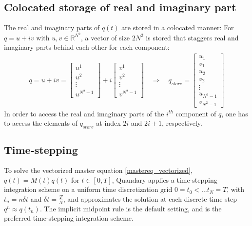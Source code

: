 \documentclass[11pt]{article}
\newcommand{\R}{\mathds{R}}
\begin{document}
  \subsection{Colocated storage of real and imaginary part}
  The real and imaginary parts of $q(t)$ are stored in a colocated manner: For
  $q = u+iv$ with $u,v\in\R^{N^2}$, a vector of size $2N^2$ is stored that
  staggers real and imaginary parts behind each other for each component:
  \begin{align*}
    q = u+iv = \begin{bmatrix}
     u^1\\u^2\\ \vdots \\ u^{N^2-1} 
    \end{bmatrix}
    + i \begin{bmatrix}
     v^1\\v^2\\ \vdots \\ v^{N^2-1} 
    \end{bmatrix}
    \quad \Rightarrow \quad
    q_{store} = \begin{bmatrix}
      u_1 \\ v_1\\ u_2 \\ v_2 \\ \vdots \\ u_{N^2-1} \\ v_{N^2-1}
    \end{bmatrix}
  \end{align*}
  In order to access the real and imaginary parts of the $i^{th}$ component of
  $q$, one has to access the elements of $q_{store}$ at index $2i$ and $2i+1$,
  respectively. 

  \subsection{Time-stepping}
    To solve the vectorized master equation \eqref{mastereq_vectorized}, $\dot
    q(t) = M(t) q(t)$ for $t\in [0,T]$, Quandary applies a time-stepping integration
    scheme on a uniform time discretization grid $0=t_0 < \dots t_{N} = T$, with
    $t_n = n \delta t$ and $\delta t = \frac{T}{N}$, and approximates the
    solution at each discrete time step $q^{n} \approx q(t_n)$. The implicit midpoint rule is the default setting, and is the preferred time-stepping integration scheme. 
   
\end{document}
